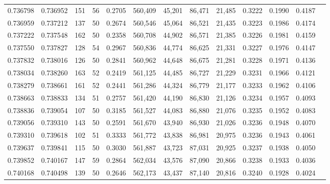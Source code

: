 \begin{tabular}{rrrrrrrrrrrrr}
0.736798 & 0.736952 &   151 &  56 &                                     0.2705 & 560,409 &  45,201 &  86,471 &  21,485 & 0.3222 & 0.1990 & 0.4187 \\
0.736959 & 0.737212 &   137 &  50 &                                     0.2674 & 560,546 &  45,064 &  86,521 &  21,435 & 0.3223 & 0.1986 & 0.4174 \\
0.737222 & 0.737548 &   162 &  50 &                                     0.2358 & 560,708 &  44,902 &  86,571 &  21,385 & 0.3226 & 0.1981 & 0.4159 \\
0.737550 & 0.737827 &   128 &  54 &                                     0.2967 & 560,836 &  44,774 &  86,625 &  21,331 & 0.3227 & 0.1976 & 0.4147 \\
0.737832 & 0.738016 &   126 &  50 &                                     0.2841 & 560,962 &  44,648 &  86,675 &  21,281 & 0.3228 & 0.1971 & 0.4136 \\
0.738034 & 0.738260 &   163 &  52 &                                     0.2419 & 561,125 &  44,485 &  86,727 &  21,229 & 0.3231 & 0.1966 & 0.4121 \\
0.738279 & 0.738661 &   161 &  52 &                                     0.2441 & 561,286 &  44,324 &  86,779 &  21,177 & 0.3233 & 0.1962 & 0.4106 \\
0.738663 & 0.738833 &   134 &  51 &                                     0.2757 & 561,420 &  44,190 &  86,830 &  21,126 & 0.3234 & 0.1957 & 0.4093 \\
0.738836 & 0.739054 &   107 &  50 &                                     0.3185 & 561,527 &  44,083 &  86,880 &  21,076 & 0.3235 & 0.1952 & 0.4083 \\
0.739056 & 0.739310 &   143 &  50 &                                     0.2591 & 561,670 &  43,940 &  86,930 &  21,026 & 0.3236 & 0.1948 & 0.4070 \\
0.739310 & 0.739618 &   102 &  51 &                                     0.3333 & 561,772 &  43,838 &  86,981 &  20,975 & 0.3236 & 0.1943 & 0.4061 \\
0.739637 & 0.739841 &   115 &  50 &                                     0.3030 & 561,887 &  43,723 &  87,031 &  20,925 & 0.3237 & 0.1938 & 0.4050 \\
0.739852 & 0.740167 &   147 &  59 &                                     0.2864 & 562,034 &  43,576 &  87,090 &  20,866 & 0.3238 & 0.1933 & 0.4036 \\
0.740168 & 0.740498 &   139 &  50 &                                     0.2646 & 562,173 &  43,437 &  87,140 &  20,816 & 0.3240 & 0.1928 & 0.4024 \\

\end{tabular}
